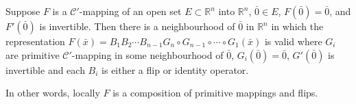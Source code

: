\begin{theorem}
	Suppose $F$ is a $\mathscr{C}'$-mapping of an open set $E \subset \mathbb{R}^n$ into $\mathbb{R}^n$, $\bar{0} \in E$, $F(\bar{0}) = \bar{0}$, and $F'(\bar{0})$ is invertible.
	Then there is a neighbourhood of $\bar{0}$ in $\mathbb{R}^n$ in which the representation $F(\bar{x}) = B_1B_2 \dotsm B_{n-1}G_n\circ G_{n-1}\circ \dotsm \circ G_1(\bar{x})$ is valid where $G_i$ are primitive $\mathscr{C}'$-mapping in some neighbourhood of $\bar{0}$, $G_i(\bar{0}) = \bar{0}$, $G'(\bar{0})$ is invertible and each $B_i$ is either a flip or identity operator.

\begin{commentary}
	In other words, locally $F$ is a composition of primitive mappings and flips.
\end{commentary}
\end{theorem}
